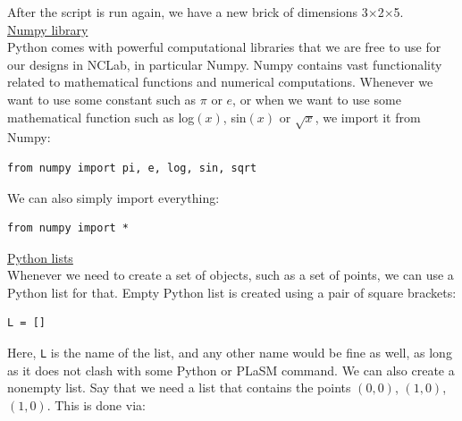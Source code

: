 \noindent
After the script is run again, we have a new brick of dimensions 3$\times$2$\times$5.\\

\noindent
\underline{Numpy library}\\

\noindent
Python comes with powerful computational libraries that we are free to use 
for our designs in NCLab, 
in particular Numpy. Numpy contains vast functionality related to 
mathematical functions and numerical computations. Whenever we want 
to use some constant such as $\pi$ or $e$, or when we want to use some 
mathematical function such as log$(x)$, sin$(x)$ or $\sqrt{x}$, we
import it from Numpy:\\

\begin{bbox}
\begin{verbatim}
from numpy import pi, e, log, sin, sqrt
\end{verbatim}
\end{bbox} 
\vspace{6mm}

\noindent
We can also simply import everything:\\

\begin{bbox}
\begin{verbatim}
from numpy import *
\end{verbatim}
\end{bbox} 
\vspace{6mm}

\noindent
\underline{Python lists}\\

\noindent
Whenever we need to create a set of objects, such as a set of points, we can use 
a Python list for that. Empty Python list is created using a pair of square brackets:\\

\begin{bbox}
\begin{verbatim}
L = []
\end{verbatim}
\end{bbox} 
\vspace{6mm}

\noindent
Here, {\tt L} is the name of the list, and any other name would be fine as well, 
as long as it does not clash with some Python or PLaSM command. We can also create 
a nonempty list. Say that we need a list that contains the points $(0, 0)$, $(1, 0)$,
$(1, 0)$. This is done via:\\


